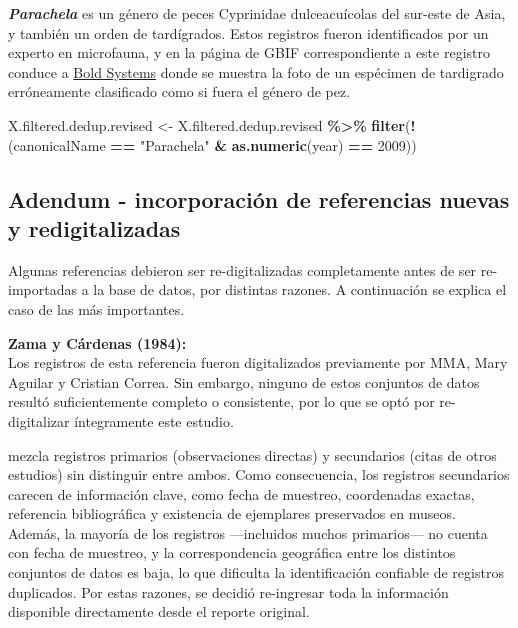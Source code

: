 \documentclass[sn-apa,pdflatex]{sn-jnl}
\newenvironment{Shaded}{\begin{snugshade}}{\end{snugshade}}
\newcommand{\DecValTok}[1]{\textcolor[rgb]{0.00,0.00,0.81}{#1}}
\newcommand{\FunctionTok}[1]{\textcolor[rgb]{0.13,0.29,0.53}{\textbf{#1}}}
\newcommand{\NormalTok}[1]{#1}
\newcommand{\OtherTok}[1]{\textcolor[rgb]{0.56,0.35,0.01}{#1}}
\newcommand{\SpecialCharTok}[1]{\textcolor[rgb]{0.81,0.36,0.00}{\textbf{#1}}}
\newcommand{\StringTok}[1]{\textcolor[rgb]{0.31,0.60,0.02}{#1}}
\begin{document}
\textbf{\emph{Parachela}} es un género de peces Cyprinidae
dulceacuícolas del sur-este de Asia, y también un orden de tardígrados.
Estos registros fueron identificados por un experto en microfauna, y en
la página de GBIF correspondiente a este registro conduce a
\href{https://portal.boldsystems.org/record/MSACA661-12}{Bold Systems}
donde se muestra la foto de un espécimen de tardigrado erróneamente
clasificado como si fuera el género de pez.

\begin{Shaded}
\begin{Highlighting}[]
\NormalTok{X.filtered.dedup.revised }\OtherTok{\textless{}{-}}\NormalTok{ X.filtered.dedup.revised }\SpecialCharTok{\%\textgreater{}\%}
    \FunctionTok{filter}\NormalTok{(}\SpecialCharTok{!}\NormalTok{(canonicalName }\SpecialCharTok{==} \StringTok{"Parachela"} \SpecialCharTok{\&} \FunctionTok{as.numeric}\NormalTok{(year) }\SpecialCharTok{==}
        \DecValTok{2009}\NormalTok{))}
\end{Highlighting}
\end{Shaded}

\subsection{Adendum - incorporación de referencias nuevas y
redigitalizadas}\label{adendum---incorporaciuxf3n-de-referencias-nuevas-y-redigitalizadas}

Algunas referencias debieron ser re-digitalizadas completamente antes de
ser re-importadas a la base de datos, por distintas razones. A
continuación se explica el caso de las más importantes.

\textbf{Zama y Cárdenas (1984):}\\
Los registros de esta referencia fueron digitalizados previamente por
MMA, Mary Aguilar y Cristian Correa. Sin embargo, ninguno de estos
conjuntos de datos resultó suficientemente completo o consistente, por
lo que se optó por re-digitalizar íntegramente este estudio.

\citet{zamaIntroductionAysenChile1984} mezcla registros primarios
(observaciones directas) y secundarios (citas de otros estudios) sin
distinguir entre ambos. Como consecuencia, los registros secundarios
carecen de información clave, como fecha de muestreo, coordenadas
exactas, referencia bibliográfica y existencia de ejemplares preservados
en museos. Además, la mayoría de los registros ---incluidos muchos
primarios--- no cuenta con fecha de muestreo, y la correspondencia
geográfica entre los distintos conjuntos de datos es baja, lo que
dificulta la identificación confiable de registros duplicados. Por estas
razones, se decidió re-ingresar toda la información disponible
directamente desde el reporte original.
\end{document}
